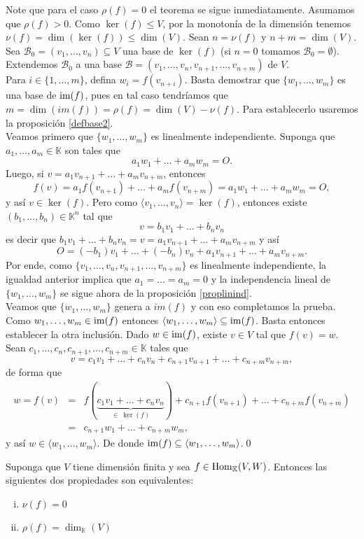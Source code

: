 \dem Note que para el caso $\rho(f)=0$ el teorema se sigue inmediatamente. Asumamos que $\rho(f)>0$. Como $\ker(f)\le V$, por la monoton\'ia de la dimensi\'on tenemos $\nu(f)=\dim\left(\ker(f)\right)\le\dim(V)$. Sean $n=\nu(f)$ y $n+m=\dim (V)$. Sea $\mathcal{B}_0=(v_1,\ldots,v_n)\subseteq V$ una base de $\ker(f)$ (si $n=0$ tomamos $\mathcal{B}_0=\emptyset$). Extendemos $\mathcal{B}_0$ a una base $\mathcal{B}=(v_1,\ldots,v_n,v_{n+1},\ldots,v_{n+m})$ de $V$.\\
Para $i\in\{1,\ldots,m\}$, defina $w_i=f(v_{n+i})$. Basta demostrar que $\{w_1,\ldots,w_m\}$ es una base de $\operatorname{im}(f)$, pues en tal caso tendr\'iamos que $m=\dim\left(im(f)\right)=\rho(f)=\dim (V)-\nu(f)$. Para establecerlo usaremos la proposici\'on \ref{defbase2}.\\
Veamos primero que $\{w_1,\ldots,w_m\}$ es linealmente independiente. Suponga que $a_1,\ldots,a_m\in \mathbb{K}$ son tales que
\[
a_1w_1+\ldots+a_mw_m=O.
\]
Luego, si $v=a_1v_{n+1}+\ldots+a_mv_{n+m}$, entonces
\[
f(v)=a_1f(v_{n+1})+\ldots+a_mf(v_{n+m})=a_1w_1+\ldots+a_mw_m=O,
\]
y as\'i $v\in\ker(f)$. Pero como $\langle v_1,\ldots,v_n\rangle=\ker(f)$, entonces existe $(b_1,\ldots,b_n)\in \mathbb{K}^n$ tal que
\[
v=b_1v_1+\ldots+b_nv_n
\]
es decir que $b_1v_1+\ldots+b_nv_n=v=a_1v_{n+1}+\ldots+a_mv_{n+m}$ y as\'i
\[
O=(-b_1)v_1+\ldots+(-b_n)v_n+a_1v_{n+1}+\ldots+a_mv_{n+m}.
\]
Por ende, como $\{v_1,\ldots,v_n,v_{n+1},\ldots,v_{n+m}\}$ es linealmente independiente, la igualdad anterior implica que $a_1=\ldots=a_m=0$ y la independencia lineal de $\{w_1,\ldots,w_m\}$ se sigue ahora de la  proposici\'on \ref{proplinind}.\\
Veamos que  $\{w_1,\ldots,w_m\}$ genera a $im(f)$ y con eso completamos la prueba. Como $w_1,\ldots,w_m\in \operatorname{im}(f)$ entonces $\langle w_1,\ldots,w_m\rangle\subseteq\operatorname{im}(f)$. Basta entonces establecer la otra inclusi\'on. Dado $w\in\operatorname{im}(f)$, existe $v\in V$ tal que $f(v)=w$. Sean $c_1,\ldots,c_n,c_{n+1},\ldots,c_{n+m}\in \mathbb{K}$ tales que 
\[
v=c_1v_1+\ldots+c_nv_n+c_{n+1}v_{n+1}+\ldots+c_{n+m}v_{n+m},
\]
de forma que
\begin{eqnarray*}
w=f(v) & = & f(\underbrace{c_1v_1+\ldots+c_nv_n}_{\in\ \ker(f)})+c_{n+1}f(v_{n+1})+\ldots+c_{n+m}f(v_{n+m})\\
           & = & c_{n+1}w_1+\ldots+c_{n+m}w_m,
\end{eqnarray*}
y as\'i $w\in\langle w_1,\ldots,w_m\rangle$. De donde $\operatorname{im}(f)\subseteq\langle w_1,\ldots,w_m\rangle$.\qed

\begin{coro}\label{corteorango}
Suponga que $V$ tiene dimensi\'on finita y sea $f\in\operatorname{Hom}_{\mathbb{K}}(V,W)$. Entonces las siguientes dos propiedades son equivalentes:
\begin{enumerate}[(i)]
\item $\nu(f)=0$
\item $\rho(f)=\dim_{\mathbb{K}}(V)$
\end{enumerate}
\end{coro}

